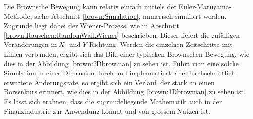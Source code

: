 Die Brownsche Bewegung kann relativ einfach mittels der Euler-Maruyama-Methode, siehe Abschnitt \ref{brown:Simulation}, numerisch simuliert werden. Zugrunde liegt dabei der Wiener-Prozess, wie in Abschnitt \ref{brown:Rauschen:RandomWalkWiener} beschrieben. Dieser liefert die zufälligen Veränderungen in $ X $- und $ Y $-Richtung. Werden die einzelnen Zeitschritte mit Linien verbunden, ergibt sich das Bild einer typischen Brownschen Bewegung, wie dies in der Abbildung \ref{brown:2Dbrownian} zu sehen ist. Führt man eine solche Simulation in einer Dimension durch und implementiert eine durchschnittlich erwartete Änderungsrate, so ergibt sich ein Verlauf, der stark an einen Börsenkurs erinnert, wie dies in der Abbildung \ref{brown:1Dbrownian} zu sehen ist. Es lässt sich erahnen, dass die zugrundeliegende Mathematik auch in der Finanzindustrie zur Anwendung kommt und von grossem Nutzen ist.

